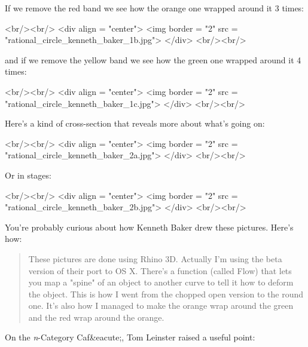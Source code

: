 If we remove the red band we see how the orange one wrapped around
it 3 times:

<br/><br/>
<div align = "center">
<img border = "2" src = "rational_circle_kenneth_baker_1b.jpg">
</div>
<br/><br/>

and if we remove the yellow band we see how the green one wrapped
around it 4 times:

<br/><br/>
<div align = "center">
<img border = "2" src = "rational_circle_kenneth_baker_1c.jpg">
</div>
<br/><br/>

Here's a kind of cross-section that reveals more about what's going
on:

<br/><br/>
<div align = "center">
<img border = "2" src = "rational_circle_kenneth_baker_2a.jpg">
</div>
<br/><br/>

Or in stages:

<br/><br/>
<div align = "center">
<img border = "2" src = "rational_circle_kenneth_baker_2b.jpg">
</div>
<br/><br/>

You're probably curious about how Kenneth Baker drew these pictures.
Here's how:

\begin{quote}

These pictures are done using Rhino 3D. Actually I'm using the beta
version of their port to OS X. There's a function (called Flow) that
lets you map a "spine" of an object to another curve to tell it how to
deform the object. This is how I went from the chopped open version to
the round one. It's also how I managed to make the orange wrap around
the green and the red wrap around the orange.

\end{quote}

On the \emph{n}-Category Caf&eacute;, Tom Leinster raised a useful point:

